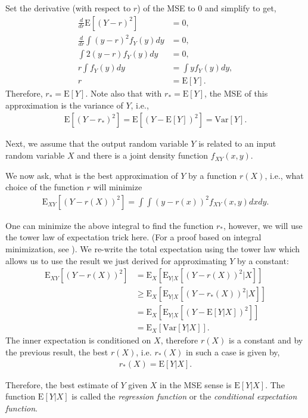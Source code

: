 \documentclass{amsart}
\theoremstyle{plain}
\numberwithin{equation}{section}
\begin{document}
Set the derivative (with respect to $r$) of the MSE to $0$ and simplify to get,
\begin{align*}
\frac{d}{dr} \mathrm{E}[(Y-r)^2] &= 0,\\
\frac{d}{dr}\int (y-r)^2f_Y(y) dy &= 0,\\
\int 2(y-r)f_Y(y) dy &= 0,\\
r \int f_Y(y) dy &= \int y f_Y(y) dy,\\
r &= \mathrm{E}[Y].
\end{align*}
Therefore, $r_* = \mathrm{E}[Y]$. 
Note also that with $r_*=\mathrm{E}[Y]$, the MSE of this approximation 
is the variance of $Y$, i.e.,
\begin{align*}
\mathrm{E}[(Y-r_*)^2] = \mathrm{E}[(Y-\mathrm{E}[Y])^2]=\mathrm{Var}[Y].
\end{align*}

Next, we assume that the output random variable $Y$ is 
related to an input random variable $X$ and
there is a joint density function $f_{XY}(x,y)$. 

We now ask, what is the best approximation of $Y$ by a function $r(X)$, i.e., what choice 
of the function $r$ will minimize
\begin{align*}
\mathrm{E}_{XY}[(Y-r(X))^2] = \int \int (y-r(x))^2 f_{XY}(x, y) dx dy.
\end{align*}

One can minimize the above integral to find the function $r_*$, however, we will use the tower law of 
expectation trick here. (For a proof based on integral minimization, see \cite[pp. 263]{papoulis2002probability}). We re-write the total expectation 
using the tower law which allows us to use the result we just derived
for approximating $Y$ by a constant:
\begin{align*}
\mathrm{E}_{XY}[(Y-r(X))^2] &= \mathrm{E}_X[\mathrm{E}_{Y|X}[(Y-r(X))^2|X]]\\
&\geq \mathrm{E}_X[\mathrm{E}_{Y|X}[(Y-r_*(X))^2|X]]\\
&= \mathrm{E}_X[\mathrm{E}_{Y|X}[(Y-\mathrm{E}[Y|X])^2]]\\
&= \mathrm{E}_X[\mathrm{Var}[Y|X]].
\end{align*}
The inner expectation is conditioned on $X$, therefore $r(X)$ is a constant and by the previous 
result, the best $r(X)$, i.e. $r_*(X)$ in such a case is given by,
\begin{align*}
r_*(X) = \mathrm{E}[Y|X].
\end{align*}

Therefore, the best estimate 
of $Y$ given $X$ in the MSE sense 
is $\mathrm{E}[Y|X]$. The function
$\mathrm{E}[Y|X]$ is called the 
\emph{regression function} or the 
\emph{conditional expectation function}.
\end{document}
